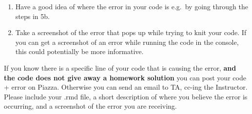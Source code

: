 \documentclass[]{article}
\begin{document}
\begin{enumerate}
  \begin{enumerate}
  \def\labelenumii{\alph{enumii})}
  \item
    Have a good idea of where the error in your code is e.g.~by going
    through the steps in 5b.
  \item
    Take a screenshot of the error that pops up while trying to knit
    your code. If you can get a screenshot of an error while running the
    code in the console, this could potentially be more informative.
  \end{enumerate}

  If you know there is a specific line of your code that is causing the
  error, \textbf{and the code does not give away a homework solution}
  you can post your code + error on Piazza. Otherwise you can send an
  email to TA, cc-ing the Instructor. Please include your .rmd file, a
  short description of where you believe the error is occurring, and a
  screenshot of the error you are receiving.
\end{enumerate}
\end{document}
